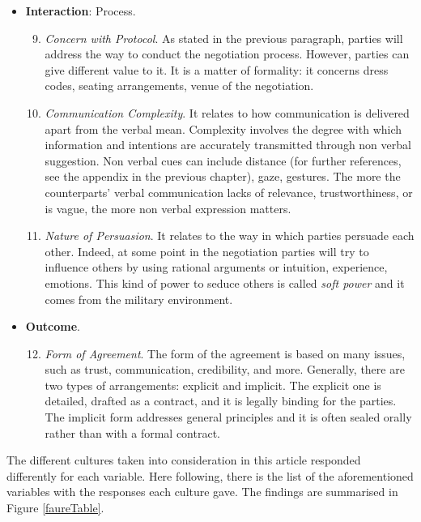 \documentclass[../main.tex]{subfiles}
\begin{document}
\begin{itemize}
     \item \textbf{Interaction}: Process.
    \begin{enumerate}
        \setcounter{enumi}{8}
        
        \item \textit{Concern with Protocol}. As stated in the previous paragraph, parties will address the way to conduct the negotiation process. However, parties can give different value to it. It is a matter of formality: it concerns dress codes, seating arrangements, venue of the negotiation.
        
        \item \textit{Communication Complexity}. It relates to how communication is delivered apart from the verbal mean. Complexity involves the degree with which information and intentions are accurately transmitted through non verbal suggestion. Non verbal cues can include distance (for further references, see the appendix in the previous chapter), gaze, gestures. The more the counterparts' verbal communication lacks of relevance, trustworthiness, or is vague, the more non verbal expression matters.
        
        \item \textit{Nature of Persuasion}. It relates to the way in which parties persuade each other. Indeed, at some point in the negotiation parties will try to influence others by using rational arguments or intuition, experience, emotions. This kind of power to seduce others is called \textit{soft power} and it comes from the military environment.
    \end{enumerate}
    
    \item \textbf{Outcome}.
    \begin{enumerate}
        \setcounter{enumi}{11}
        
        \item \textit{Form of Agreement}. The form of the agreement is based on many issues, such as trust, communication, credibility, and more. Generally, there are two types of arrangements: explicit and implicit. The explicit one is detailed, drafted as a contract, and it is legally binding for the parties. The implicit form addresses general principles and it is often sealed orally rather than with a formal contract.
    \end{enumerate}
\end{itemize}
The different cultures taken into consideration in this article responded differently for each variable. Here following, there is the list of the aforementioned variables with the responses each culture gave. The findings are summarised in Figure \ref{faureTable}.
\end{document}
